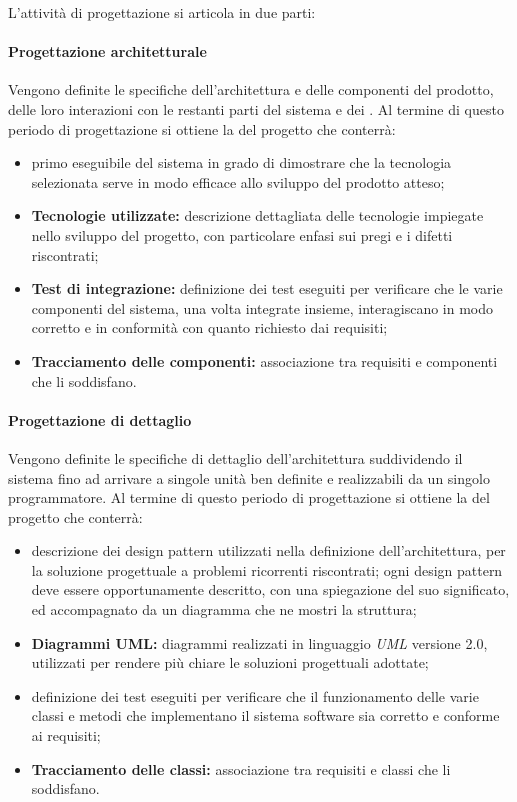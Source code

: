 \label{PeriodiProgettazione}L'attività di progettazione si articola in due parti: 
\paragraph*{Progettazione architetturale} 
Vengono definite le specifiche dell'architettura e delle componenti del prodotto, delle loro interazioni con le restanti parti del sistema e dei . Al termine di questo periodo di progettazione si ottiene la  del progetto che conterrà: 
\begin{itemize}
	\item {} primo eseguibile del sistema in grado di dimostrare che la tecnologia selezionata serve in modo efficace allo sviluppo del prodotto atteso;
	\item \textbf{Tecnologie utilizzate:} descrizione dettagliata delle tecnologie impiegate nello sviluppo del progetto, con particolare enfasi sui pregi e i difetti riscontrati;
	\item \textbf{Test di integrazione:} definizione dei test eseguiti per verificare che le varie componenti del sistema, una volta integrate insieme, interagiscano in modo corretto e in conformità con quanto richiesto dai requisiti;
	\item \textbf{Tracciamento delle componenti:} associazione tra requisiti e componenti che li soddisfano.
\end{itemize}

\paragraph*{Progettazione di dettaglio}
Vengono definite le specifiche di dettaglio dell'architettura suddividendo il sistema fino ad arrivare a singole unità ben definite e realizzabili da un singolo programmatore. Al termine di questo periodo di progettazione si ottiene la \textit{} del progetto che conterrà: 
\begin{itemize}
	\item {} descrizione dei design pattern utilizzati nella definizione dell'architettura, per la soluzione progettuale a problemi ricorrenti riscontrati; ogni design pattern deve essere opportunamente descritto, con una spiegazione del suo significato, ed accompagnato da un diagramma che ne mostri la struttura;
	\item \textbf{Diagrammi UML:} diagrammi realizzati in linguaggio \textit{UML} versione 2.0, utilizzati per rendere più chiare le soluzioni progettuali adottate; 
	\item {} definizione dei test eseguiti per verificare che il funzionamento delle varie classi e metodi che implementano il sistema software sia corretto e conforme ai requisiti;
	\item \textbf{Tracciamento delle classi:} associazione tra requisiti e classi che li soddisfano.
\end{itemize}

